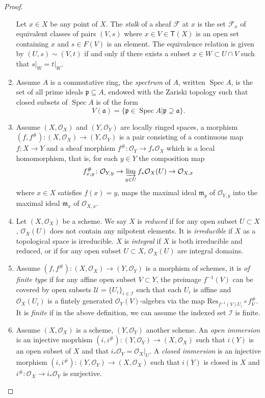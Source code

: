 \documentclass[12pt]{amsart}
\newcommand{\spec}{\operatorname{Spec}}
\begin{document}
\begin{proof}
\begin{enumerate}
	Let $x\in X$ be any point of $X$. The \emph{stalk} of a sheaf $\mathscr{F} $ at $x$ is the set $\mathscr{F}_x $ of equivalent classes of pairs $(V,s)$ where $x\in V\in\mathsf{T} (X)$ is an open set containing $x$ and $s\in F(V)$ is an element. The equivalence relation is given by $(U,s)\sim (V,t)$ if and only if there exists a subset $x\in W\subset U\cap V$ such that $s\vert_W =t\vert_W $.
	\item Assume $A$ is a commutative ring, the \emph{spectrum} of $A$, written $\spec A$, is the set of all prime ideals $\mathfrak{p}\subseteq A$, endowed with the Zariski topology such that closed subsets of $\spec A$ is of the form
	\[
	V(\mathfrak{a} )=\{\mathfrak{p}\in\spec A\vert\mathfrak{p}\supseteq\mathfrak{a}\}.
	\]
	\item Assume $(X,\mathcal{O}_X )$ and $(Y,\mathcal{O}_Y )$ are locally ringed spaces, a morphism $(f,f^{\# })\colon (X,\mathcal{O}_X )\to (Y,\mathcal{O}_Y )$ is a pair consisting of a continuous map $f\colon X\to Y$ and a sheaf morphism $f^{\# }\colon\mathcal{O}_Y \to f_{\ast }\mathcal{O}_X $ which is a local homomorphism, that is, for each $y\in Y$ the composition map $$f^{\# }_{x,y}\colon\mathcal{O}_{Y,y}\to\varinjlim_{y\in U} f_{\ast }\mathcal{O}_X (U)\to\mathcal{O}_{X,x} $$
	where $x\in X$ satisfies $f(x)=y$, maps the maximal ideal $\mathfrak{m}_y $ of $\mathcal{O}_{Y,y} $ into the maximal ideal $\mathfrak{m}_x $ of $\mathcal{O}_{X,x} $.
	\item Let $(X,\mathcal{O}_X )$ be a scheme. We say $X$ is \emph{reduced} if for any open subset $U\subset X$, $\mathcal{O}_X (U)$ does not contain any nilpotent elements. It is \emph{irreducible} if $X$ as a topological space is irreducible. $X$ is \emph{integral} if $X$ is both irreducible and reduced, or if for any open subset $U\subset X$, $\mathcal{O}_X (U)$ are integral domains.
	\item Assume $(f,f^{\# })\colon (X,\mathcal{O}_X )\rightarrow (Y,\mathcal{O}_Y )$ is a morphism of schemes, it is \emph{of finite type} if for any affine open subset $V\subset Y$, the preimage $f^{-1} (V)$ can be covered by open subsets $\mathcal{U} =\{U_i\}_{i\in\mathcal{I} } $ such that each $U_i $ is affine and $\mathcal{O}_X (U_i )$ is a fintely generated $\mathcal{O}_Y (V)$-algebra via the map $\mathrm{Res}_{f^{-1} (V)U_i}\circ f^{\# }_V $. It is \emph{finite} if in the above definition, we can assume the indexed set $\mathcal{I} $ is finite.
	\item Assume $(X,\mathcal{O}_X )$ is a scheme, $(Y,\mathcal{O}_Y )$ another scheme. An \emph{open immersion} is an injective moprhism $(i,i^{\# })\colon (Y,\mathcal{O}_Y )\to (X,\mathcal{O}_X )$ such that $i(Y)$ is an open subset of $X$ and that $i_{\ast }\mathcal{O}_Y =\mathcal{O}_X\vert_U $. A \emph{closed immersion} is an injective morphism $(i,i^{\# } )\colon (Y,\mathcal{O}_Y )\to (X,\mathcal{O}_X )$ such that $i(Y)$ is closed in $X$ and $i^{\# }\colon\mathcal{O}_X\to i_{\ast }\mathcal{O}_Y $ is surjective.

\end{enumerate}
\end{proof}
\end{document}
